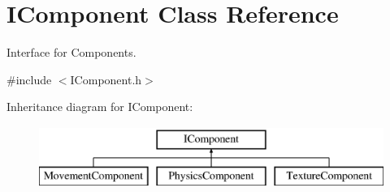 \hypertarget{class_i_component}{}\section{I\+Component Class Reference}
\label{class_i_component}


Interface for Components.  




{\ttfamily \#include $<$I\+Component.\+h$>$}

Inheritance diagram for I\+Component\+:\begin{figure}[H]
\begin{center}
\leavevmode
\includegraphics[height=2.000000cm]{class_i_component}
\end{center}
\end{figure}
